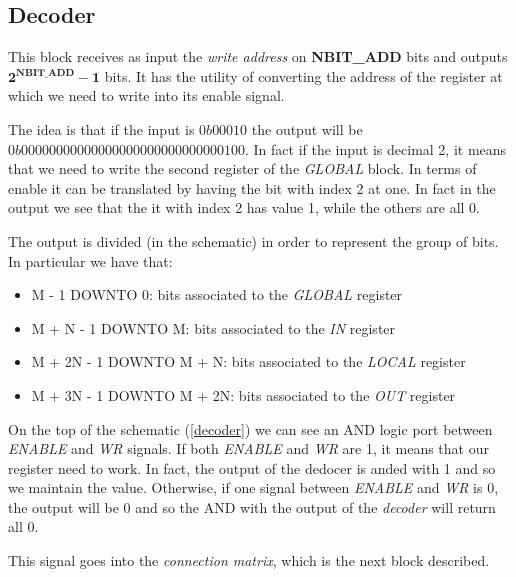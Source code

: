 \subsection{Decoder}
This block receives as input the \emph{write address} on \textbf{NBIT\_ADD} bits and outputs \(\mathbf{2^{NBIT\_ADD} - 1} \) bits. It has the utility of converting the address of the register at which we need to write into its enable signal. 

The idea is that if the input is \(0b00010\) the output will be \(0b00000000000000000000000000000100\). In fact if the input is decimal 2, it means that we need to write the second register of the \emph{GLOBAL} block. In terms of enable it can be translated by having the bit with index 2 at one. In fact in the output we see that the it with index 2 has value 1, while the others are all 0. 

The output is divided (in the schematic) in order to represent the group of bits. In particular we have that: 
\begin{itemize}
    \item M - 1 DOWNTO 0: bits associated to the \emph{GLOBAL} register
    \item M + N - 1 DOWNTO M: bits associated to the \emph{IN} register
    \item M + 2N - 1 DOWNTO M + N: bits associated to the \emph{LOCAL} register
    \item M + 3N - 1 DOWNTO M + 2N: bits associated to the \emph{OUT} register
\end{itemize}

On the top of the schematic (\autoref{decoder}) we can see an AND logic port between \emph{ENABLE} and \emph{WR} signals. If both \emph{ENABLE} and \emph{WR} are 1, it means that our register need to work. In fact, the output of the dedocer is anded with 1 and so we maintain the value. Otherwise, if one signal between \emph{ENABLE} and \emph{WR} is 0, the output will be 0 and so the AND with the output of the \emph{decoder} will return all 0. 

This signal goes into the \emph{connection matrix}, which is the next block described. 

